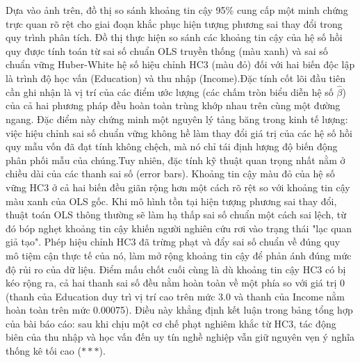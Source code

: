 Dựa vào ảnh trên, đồ thị so sánh khoảng tin cậy 95\% cung cấp một minh chứng trực quan rõ rệt cho giai đoạn khắc phục hiện tượng phương sai thay đổi trong quy trình phân tích. Đồ thị thực hiện so sánh các khoảng tin cậy của hệ số hồi quy được tính toán từ sai số chuẩn OLS truyền thống (màu xanh) và sai số chuẩn vững Huber-White hệ số hiệu chỉnh HC3 (màu đỏ) đối với hai biến độc lập là trình độ học vấn (Education) và thu nhập (Income).Đặc tính cốt lõi đầu tiên cần ghi nhận là vị trí của các điểm ước lượng (các chấm tròn biểu diễn hệ số $\hat{\beta}$) của cả hai phương pháp đều hoàn toàn trùng khớp nhau trên cùng một đường ngang. Đặc điểm này chứng minh một nguyên lý tảng băng trong kinh tế lượng: việc hiệu chỉnh sai số chuẩn vững không hề làm thay đổi giá trị của các hệ số hồi quy mẫu vốn đã đạt tính không chệch, mà nó chỉ tái định lượng độ biến động phân phối mẫu của chúng.Tuy nhiên, đặc tính kỹ thuật quan trọng nhất nằm ở chiều dài của các thanh sai số (error bars). Khoảng tin cậy màu đỏ của hệ số vững HC3 ở cả hai biến đều giãn rộng hơn một cách rõ rệt so với khoảng tin cậy màu xanh của OLS gốc. Khi mô hình tồn tại hiện tượng phương sai thay đổi, thuật toán OLS thông thường sẽ làm hạ thấp sai số chuẩn một cách sai lệch, từ đó bóp nghẹt khoảng tin cậy khiến người nghiên cứu rơi vào trạng thái "lạc quan giả tạo". Phép hiệu chỉnh HC3 đã trừng phạt và đẩy sai số chuẩn về đúng quy mô tiệm cận thực tế của nó, làm mở rộng khoảng tin cậy để phản ánh đúng mức độ rủi ro của dữ liệu. Điểm mấu chốt cuối cùng là dù khoảng tin cậy HC3 có bị kéo rộng ra, cả hai thanh sai số đều nằm hoàn toàn về một phía so với giá trị 0 (thanh của Education duy trì vị trí cao trên mức 3.0 và thanh của Income nằm hoàn toàn trên mức 0.00075). Điều này khẳng định kết luận trong bảng tổng hợp của bài báo cáo: sau khi chịu một cơ chế phạt nghiêm khắc từ HC3, tác động biên của thu nhập và học vấn đến uy tín nghề nghiệp vẫn giữ nguyên vẹn ý nghĩa thống kê tối cao ($***$).
